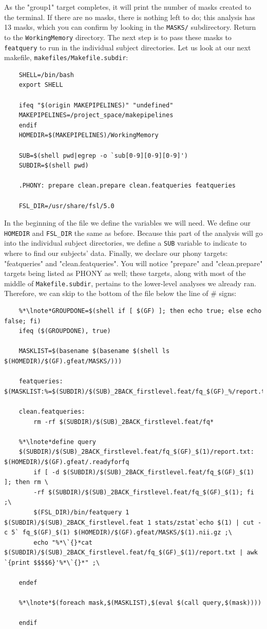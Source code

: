 As the "group1" target completes, it will print the number of masks created to the terminal. If there are no masks, there is nothing left to do; this analysis has 13 masks, which you can confirm by looking in the \texttt{MASKS/} subdirectory. Return to the \texttt{WorkingMemory} directory. The next step is to pass these masks to \texttt{featquery} to run in the individual subject directories. Let us look at our next makefile, \texttt{makefiles/Makefile.subdir}:

\begin{lstlisting}
	SHELL=/bin/bash
	export SHELL
	
	ifeq "$(origin MAKEPIPELINES)" "undefined"
	MAKEPIPELINES=/project_space/makepipelines
	endif
	HOMEDIR=$(MAKEPIPELINES)/WorkingMemory
	
	SUB=$(shell pwd|egrep -o `sub[0-9][0-9][0-9]')
	SUBDIR=$(shell pwd)
	
	.PHONY: prepare clean.prepare clean.featqueries featqueries

	FSL_DIR=/usr/share/fsl/5.0
\end{lstlisting}

In the beginning of the file we define the variables we will need. We define our \texttt{HOMEDIR} and \texttt{FSL_DIR} the same as before. Because this part of the analysis will go into the individual subject directories, we define a \texttt{SUB} variable to indicate to \maken{} where to find our subjects' data. Finally, we declare our phony targets: "featqueries" and "clean.featqueries". You will notice "prepare" and "clean.prepare" targets being listed as PHONY as well; these targets, along with most of the middle of \texttt{Makefile.subdir}, pertains to the lower-level analyses we already ran. Therefore, we can skip to the bottom of the file below the line of \# signs:
\begin{lstlisting}	
	%*\lnote*GROUPDONE=$(shell if [ $(GF) ]; then echo true; else echo false; fi)
	ifeq ($(GROUPDONE), true)
	
	MASKLIST=$(basename $(basename $(shell ls $(HOMEDIR)/$(GF).gfeat/MASKS/)))
	
	featqueries: $(MASKLIST:%=$(SUBDIR)/$(SUB)_2BACK_firstlevel.feat/fq_$(GF)_%/report.txt)
	
	clean.featqueries:
		rm -rf $(SUBDIR)/$(SUB)_2BACK_firstlevel.feat/fq*
	
	%*\lnote*define query
	$(SUBDIR)/$(SUB)_2BACK_firstlevel.feat/fq_$(GF)_$(1)/report.txt: $(HOMEDIR)/$(GF).gfeat/.readyforfq
		if [ -d $(SUBDIR)/$(SUB)_2BACK_firstlevel.feat/fq_$(GF)_$(1) ]; then rm \
		-rf $(SUBDIR)/$(SUB)_2BACK_firstlevel.feat/fq_$(GF)_$(1); fi ;\
		$(FSL_DIR)/bin/featquery 1 $(SUBDIR)/$(SUB)_2BACK_firstlevel.feat 1 stats/zstat`echo $(1) | cut -c 5` fq_$(GF)_$(1) $(HOMEDIR)/$(GF).gfeat/MASKS/$(1).nii.gz ;\
		echo "%*\`{}*cat $(SUBDIR)/$(SUB)_2BACK_firstlevel.feat/fq_$(GF)_$(1)/report.txt | awk `{print $$$$6}'%*\`{}*" ;\
		
	endef
	
	%*\lnote*$(foreach mask,$(MASKLIST),$(eval $(call query,$(mask))))
	
	endif
\end{lstlisting}

